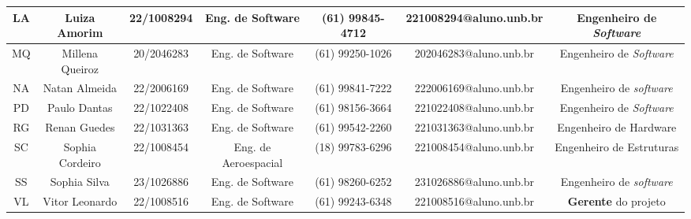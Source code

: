 \begin{landscape}
\begin{table}[htpb]
\begin{center}
\begin{tabular}{|c|c|c|c|c|c|c|}
LA & Luiza Amorim          & 22/1008294        & Eng. de Software      & (61) 99845-4712   & 221008294@aluno.unb.br   & Engenheiro de \textit{Software} \\ \hline
MQ & Millena Queiroz       & 20/2046283        & Eng. de Software      & (61) 99250-1026   & 202046283@aluno.unb.br   & Engenheiro de \textit{Software} \\ \hline
NA & Natan Almeida         & 22/2006169        & Eng. de Software      & (61) 99841-7222   & 222006169@aluno.unb.br   & Engenheiro de \textit{software} \\ \hline
PD & Paulo Dantas          & 22/1022408        & Eng. de Software      & (61) 98156-3664   & 221022408@aluno.unb.br   & Engenheiro de \textit{Software} \\ \hline
RG & Renan Guedes          & 22/1031363        & Eng. de Software      & (61) 99542-2260   & 221031363@aluno.unb.br   & Engenheiro de Hardware \\ \hline
SC & Sophia Cordeiro       & 22/1008454        & Eng. de Aeroespacial  & (18) 99783-6296   & 221008454@aluno.unb.br   & Engenheiro de Estruturas \\ \hline
SS & Sophia Silva          & 23/1026886        & Eng. de Software      & (61) 98260-6252   & 231026886@aluno.unb.br   & Engenheiro de \textit{software} \\ \hline
VL & Vitor Leonardo        & 22/1008516        & Eng. de Software      & (61) 99243-6348   & 221008516@aluno.unb.br   & \textbf{Gerente} do projeto \\ \hline
\end{tabular}
\end{center}
\end{table}



\end{landscape}
